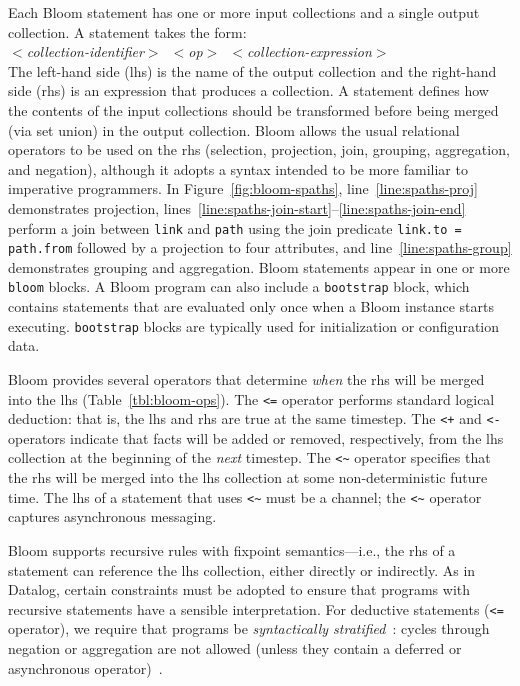 Each Bloom statement has one or more input collections and a single output
collection.  A statement takes the form: \\ \noindent
\mbox{\hspace{0.25in}\emph{$<$collection-identifier$>$ $<$op$>$
    $<$collection-expression$>$}}\\ \noindent
The left-hand side (lhs) is the name of the output collection and the right-hand
side (rhs) is an expression that produces a collection.  A statement defines how
the contents of the input collections should be transformed before being
merged (via set union) in the output collection. Bloom allows the usual
relational operators to be used on the rhs (selection, projection, join,
grouping, aggregation, and negation), although it adopts a syntax intended to be
more familiar to imperative programmers. In Figure~\ref{fig:bloom-spaths},
line~\ref{line:spaths-proj} demonstrates projection,
lines~\ref{line:spaths-join-start}--\ref{line:spaths-join-end} perform a join
between \texttt{link} and \texttt{path} using the join predicate
\verb+link.to = path.from+ followed by a projection to four attributes, and
line~\ref{line:spaths-group} demonstrates grouping and aggregation. Bloom
statements appear in one or more \texttt{bloom} blocks. A Bloom program can also
include a \texttt{bootstrap} block, which contains statements that are evaluated
only once when a Bloom instance starts executing. \texttt{bootstrap} blocks are
typically used for initialization or configuration data.

Bloom provides several operators that determine \emph{when} the rhs will be
merged into the lhs (Table~\ref{tbl:bloom-ops}). The \verb|<=| operator performs
standard logical deduction: that is, the lhs and rhs are true at the same
timestep. The \verb|<+| and \verb|<-| operators indicate that facts will be
added or removed, respectively, from the lhs collection at the beginning of the
\emph{next} timestep. The \verb+<~+ operator specifies that the rhs will be merged into
the lhs collection at some non-deterministic future time. The lhs of a statement
that uses \verb+<~+ must be a channel; the \verb+<~+ operator captures
asynchronous messaging.

Bloom supports recursive rules with fixpoint semantics---i.e., the rhs of a statement can reference the lhs
collection, either directly or indirectly. As in Datalog, certain constraints
must be adopted to ensure that programs with recursive statements have a
sensible interpretation. For deductive statements (\verb+<=+ operator), we
require that programs be \emph{syntactically stratified}~\cite{Apt1988}: cycles
through negation or aggregation are not allowed (unless they contain a deferred
or asynchronous operator)~\cite{dedalus}.

